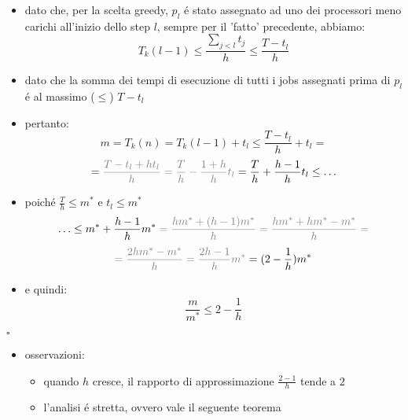 \begin{flushleft}
\begin{itemize}
		\item dato che, per la scelta greedy, $p_l$ \'e stato assegnato ad uno dei processori meno carichi all'inizio dello step $l$, sempre per il 'fatto' precedente, abbiamo:
			$$T_k(l-1)\leq\frac{\sum_{j<l}t_j}{h}\leq\frac{T-t_l}{h}$$
		\item dato che la somma dei tempi di esecuzione di tutti i jobs assegnati prima di $p_l$ \'e al massimo ($\leq$) $T-t_l$
		\item pertanto:
			$$m=T_k(n)=T_k(l-1)+t_l\leq\frac{T-t_l}{h}+t_l=$$
			$$=\color{gray}\frac{T-t_l+ht_l}{h}=\frac{T}{h}-\frac{1+h}{h}t_l\color{black}=\frac{T}{h}+\frac{h-1}{h}t_l\leq\ldots$$
		\item poich\'e $\frac{T}{h}\leq m^*$ e $t_l\leq m^*$
			$$\ldots\leq m^*+\frac{h-1}{h}m^*\color{gray}=\frac{hm^*+(h-1)m^*}{h}=\frac{hm^*+hm^*-m^*}{h}=$$
			$$\color{gray}=\frac{2hm^*-m^*}{h}=\frac{2h-1}{h}m^*\color{black}=(2-\frac{1}{h})m^*$$
		\item e quindi:
			$$\frac{m}{m^*}\leq 2-\frac{1}{h}$$
	\end{itemize}
	\hfill$\square$
	\begin{itemize}
		\item osservazioni:
		\begin{itemize}
			\item quando $h$ cresce, il rapporto di approssimazione $\frac{2-1}{h}$ tende a $2$
			\item l'analisi \'e stretta, ovvero vale il seguente teorema
		\end{itemize}
	\end{itemize}
\end{flushleft}


